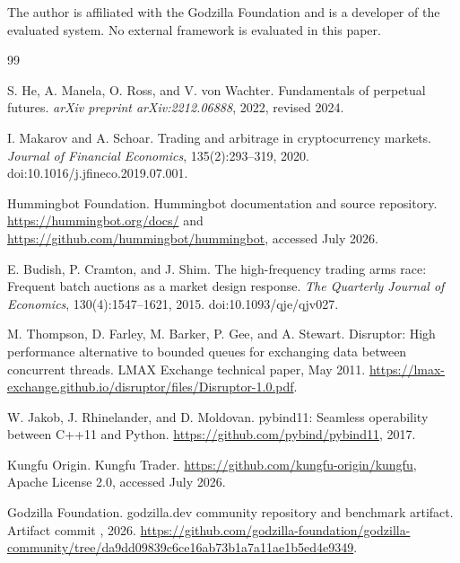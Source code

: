 \documentclass[11pt]{article}
\begin{document}
The author is affiliated with the Godzilla Foundation and is a developer of the evaluated system. No external framework is evaluated in this paper.

\begin{thebibliography}{99}

S. He, A. Manela, O. Ross, and V. von Wachter.
\newblock Fundamentals of perpetual futures.
\newblock \emph{arXiv preprint arXiv:2212.06888}, 2022, revised 2024.

I. Makarov and A. Schoar.
\newblock Trading and arbitrage in cryptocurrency markets.
\newblock \emph{Journal of Financial Economics}, 135(2):293--319, 2020.
\newblock doi:10.1016/j.jfineco.2019.07.001.

Hummingbot Foundation.
\newblock Hummingbot documentation and source repository.
\newblock \url{https://hummingbot.org/docs/} and
\url{https://github.com/hummingbot/hummingbot}, accessed July 2026.

E. Budish, P. Cramton, and J. Shim.
\newblock The high-frequency trading arms race: Frequent batch auctions as a market design response.
\newblock \emph{The Quarterly Journal of Economics}, 130(4):1547--1621, 2015.
\newblock doi:10.1093/qje/qjv027.

M. Thompson, D. Farley, M. Barker, P. Gee, and A. Stewart.
\newblock Disruptor: High performance alternative to bounded queues for exchanging data between concurrent threads.
\newblock LMAX Exchange technical paper, May 2011.
\newblock \url{https://lmax-exchange.github.io/disruptor/files/Disruptor-1.0.pdf}.

W. Jakob, J. Rhinelander, and D. Moldovan.
\newblock pybind11: Seamless operability between C++11 and Python.
\newblock \url{https://github.com/pybind/pybind11}, 2017.

Kungfu Origin.
\newblock Kungfu Trader.
\newblock \url{https://github.com/kungfu-origin/kungfu}, Apache License 2.0, accessed July 2026.

Godzilla Foundation.
\newblock godzilla.dev community repository and benchmark artifact.
\newblock Artifact commit , 2026.
\newblock \url{https://github.com/godzilla-foundation/godzilla-community/tree/da9dd09839c6ce16ab73b1a7a11ae1b5ed4e9349}.

\end{thebibliography}
\end{document}
